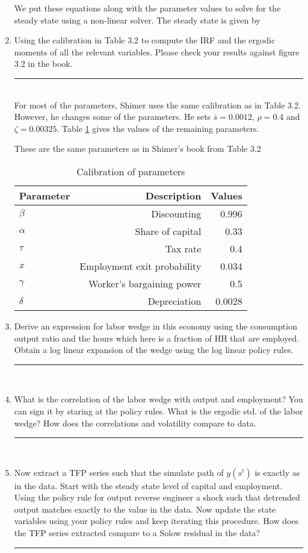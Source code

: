 \documentclass[11pt,letterpaper]{article}
\newcommand{\floatintro}[1]{
  \vspace*{0.1in}
  {\footnotesize
    #1
    }
  \vspace*{0.1in}
}
\newcommand{\Hline}{\noindent\rule{17cm}{0.5pt}}
\begin{document}
\begin{enumerate}
We put these equations along with the parameter values to solve for
the steady state using a non-linear solver. The steady state is given
by
\item Using the calibration in Table 3.2 to compute the IRF and the
  ergodic moments of all the relevant variables. Please check your
  results against figure 3.2 in the book. \\ \Hline \\
For most of the parameters, Shimer uses the same calibration as in
Table 3.2. However, he changes some of the parameters. He sets
$\bar{s} = 0.0012$, $\rho = 0.4$ and $\zeta = 0.00325$. 
Table \ref{tab:calibration} gives the values
of the remaining parameters.
\begin{table}[htbp!]
\label{tab:calibration}
\floatintro{These are the same parameters as in Shimer's book from
  Table 3.2}
\centering
\begin{tabular}{lrr}
\hline
Parameter & Description & Values \\
\hline
$\beta$ & Discounting & 0.996 \\
$\alpha$ & Share of capital & 0.33 \\
$\tau$ & Tax rate & 0.4 \\
$x$ & Employment exit probability & 0.034 \\
$\gamma$ & Worker's bargaining power & 0.5 \\
$\delta$ & Depreciation & 0.0028 \\
\hline
\end{tabular}
\caption{Calibration of parameters}
\end{table}
\item Derive an expression for labor wedge in this economy using the
  consumption output ratio and the hours which here is a fraction of
  HH that are employed. Obtain a log linear expansion of the wedge
  using the log linear policy rules. \\ \Hline \\
\item What is the correlation of the labor wedge with output and
  employment? You can sign it by staring at the policy rules. What is
  the ergodic std. of the labor wedge? How does the correlations and
  volatility compare to data. \\ \Hline \\
\item Now extract a TFP series such that the simulate path of $y(s^t)$
  is exactly as in the data. Start with the steady state level of
  capital and employment. Using the policy rule for output reverse
  engineer a shock such that detrended output matches exactly to the
  value in the data. Now update the state variables using your policy
  rules and keep iterating this procedure. How does the TFP series
  extracted compare to a Solow residual in the data? \\ \Hline \\ 
\end{enumerate}
\end{document}
